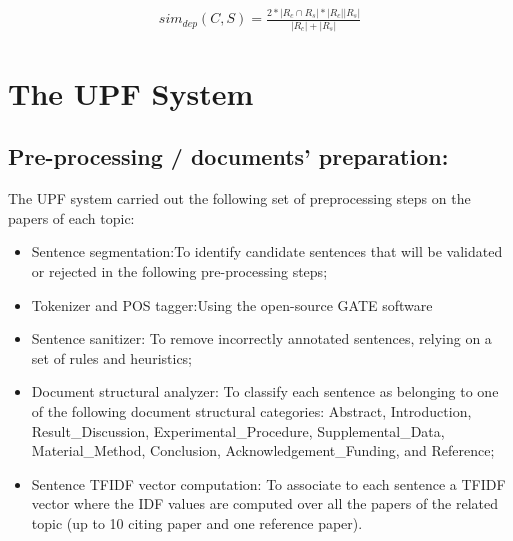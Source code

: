 \documentclass[11pt]{article}
\begin{document}
\begin{eqnarray*}
  sim_{dep}(C,S) = \frac{2*|R_c \cap R_s| * |R_c||R_s|}{|R_c|+|R_s|}
\end{eqnarray*}


\section{The UPF System}
\subsection{Pre-processing / documents’ preparation:}
The UPF system carried out the following set of preprocessing steps on the papers of each topic:
\begin{itemize}
\item{Sentence segmentation:}To identify candidate sentences that will be validated or rejected in the following pre-processing steps;
\item{Tokenizer and POS tagger:}Using the open-source GATE software
\item{Sentence sanitizer:} To remove incorrectly annotated sentences, relying on a set of rules and heuristics;
\item{Document structural analyzer:} To classify each sentence as belonging to one of the following document structural categories: Abstract, Introduction, Result\_Discussion, Experimental\_Procedure, Supplemental\_Data, Material\_Method, Conclusion, Acknowledgement\_Funding, and Reference;
\item{Sentence TFIDF vector computation:} To associate to each sentence a TFIDF vector where the IDF values are computed over all the papers of the related topic (up to 10 citing paper and one reference paper).
\end{itemize}
\end{document}
